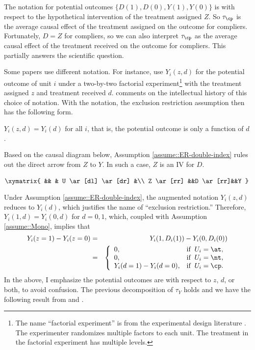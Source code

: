 The notation for potential outcomes $\{ D(1), D(0), Y(1), Y(0)  \}$ is with respect to the hypothetical intervention of the treatment assigned $Z$. So $\tau_\cp$ is the average causal effect of the treatment assigned on the outcome for compliers. Fortunately, $D=Z$ for compliers, so we can also interpret $\tau_\cp$ as the average causal effect of the treatment received on the outcome for compliers. This partially answers the scientific question. 

 

Some papers use different notation. For instance, \citet{angrist1996identification} use $Y_i(z,d)$ for the potential outcome of unit $i$ under a two-by-two factorial experiment\footnote{The name ``factorial experiment'' is from the experimental design literature \citep{dasgupta2014causal}. The experimenter randomizes multiple factors to each unit. The treatment in the factorial experiment has multiple levels.
} with the treatment assigned $z$ and treatment received $d$. \citet[][Section 3.1]{angrist2022empirical} comments on the intellectual history of this choice of notation. With the notation, the exclusion restriction assumption then has the following form.



\begin{assumption}
\label{assume::ER-double-index}
$Y_i(z,d) = Y_i(d)$ for all $i$, that is, the potential outcome is only a function of $d$.
\end{assumption}


Based on the causal diagram below, Assumption \ref{assume::ER-double-index} rules out the direct arrow from $Z$ to $Y$. In such a case, $Z$ is an IV for $D$. 
\begin{center}
$
\xymatrix{
 && & U  \ar[dl] \ar[dr] &\\
Z \ar[rr] &&D \ar[rr]&&Y
}
$
\end{center}
Under Assumption \ref{assume::ER-double-index}, the augmented notation $Y_i(z,d)$ reduces to $Y_i(d)$, which justifies the name of ``exclusion restriction.'' Therefore, $Y_i(1,d) = Y_i(0,d)$ for $d=0,1$, which, coupled with Assumption \ref{assume::Mono}, implies that
\begin{eqnarray*}
Y_i(z=1) - Y_i(z=0) &=& Y_i(1, D_i(1)) - Y_i(0, D_i(0)) \\
&=& \left \{ \begin{array} {ll}
0 , & \text{if} \hspace{2mm}  U_i = \at, \\
0 , & \text{if}  \hspace{2mm}  U_i = \nt,\\
Y_i(d=1) - Y_i(d=0) ,& \text{if} \hspace{2mm} U_i = \cp.
\end{array}
\right.  
\end{eqnarray*}
In the above, I emphasize the potential outcomes are with respect to $z$, $d$, or both, to avoid confusion. 
The previous decomposition of $\tau_Y$ holds and we have the following result from \citet{imbens1994identification} and \citet{angrist1996identification}.

